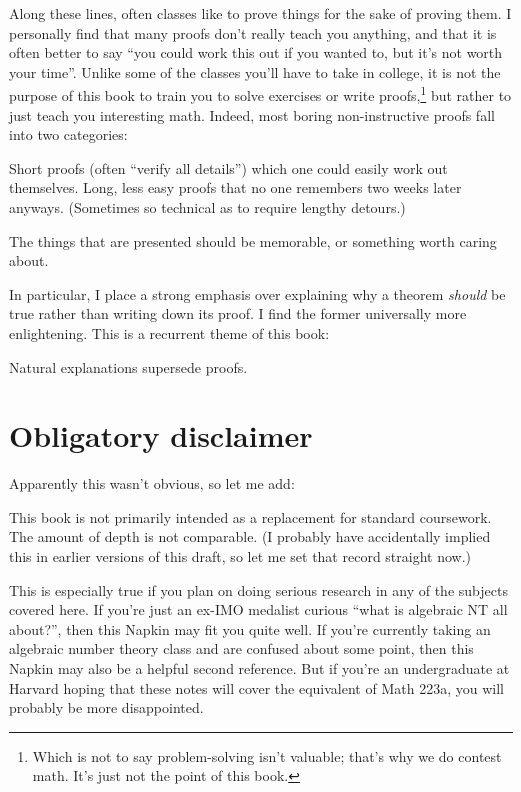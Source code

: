 Along these lines, often classes like to prove things for the sake of proving them.
I personally find that many proofs don't really teach you anything,
and that it is often better to say ``you could work this out if you wanted to, but it's not worth your time''.
Unlike some of the classes you'll have to take in college,
it is not the purpose of this book to train you to solve exercises or write proofs,\footnote{%
	Which is not to say problem-solving isn't valuable;
	that's why we do contest math.
	It's just not the point of this book.}
but rather to just teach you interesting math.
Indeed, most boring non-instructive proofs fall into two categories:
\begin{enumerate}[(i)]
	\ii Short proofs (often ``verify all details'')
	which one could easily work out themselves.
	\ii Long, less easy proofs that no one remembers
	two weeks later anyways.
	(Sometimes so technical as to require lengthy detours.)
\end{enumerate}
The things that are presented should be memorable, or something worth caring about.

In particular, I place a strong emphasis over explaining why a theorem \emph{should}
be true rather than writing down its proof.
I find the former universally more enlightening.
This is a recurrent theme of this book:
\begin{moral}
	Natural explanations supersede proofs.
\end{moral}

\section*{Obligatory disclaimer}
Apparently this wasn't obvious, so let me add:

This book is not primarily intended as a replacement for standard coursework.
The amount of depth is not comparable.
(I probably have accidentally implied this in earlier versions of this draft,
so let me set that record straight now.)

This is especially true if you plan on doing serious research
in any of the subjects covered here.
If you're just an ex-IMO medalist curious ``what is algebraic NT all about?'',
then this Napkin may fit you quite well.
If you're currently taking an algebraic number theory class and are confused
about some point, then this Napkin may also be a helpful second reference.
But if you're an undergraduate at Harvard hoping that these notes
will cover the equivalent of Math 223a, you will probably be more disappointed.

